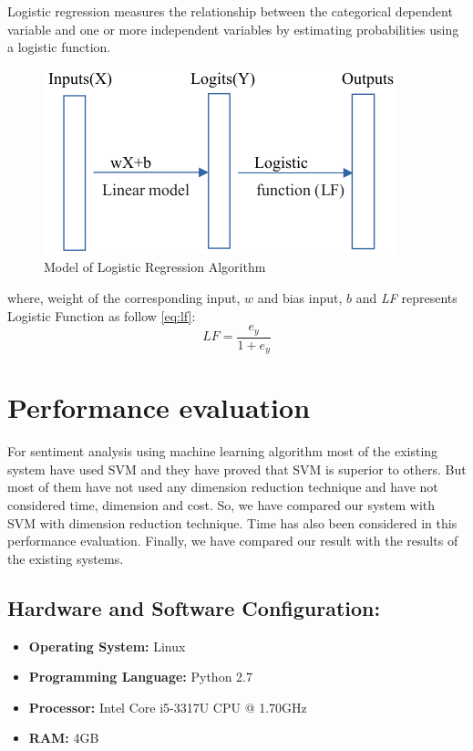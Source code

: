 \documentclass[10pt, conference]{IEEEtran}
\begin{document}
	Logistic regression measures the relationship between the categorical dependent variable and one or more independent variables by estimating probabilities using a logistic function.
	
	\begin{figure}[H]
		\includegraphics[width = 0.35\textheight]{logisticRegression}
		\caption{Model of Logistic Regression Algorithm}
		\label{fig:train}
	\end{figure}
	where, weight of the corresponding input, $w$ and bias input, $b$ and \textit{LF} represents Logistic Function as follow \eqref{eq:lf}:
	\begin{equation}
		LF = \dfrac{e_y}{1 + e_y}
		\label{eq:lf}
	\end{equation}
	
	\section{Performance evaluation}
	
	For sentiment analysis using machine learning algorithm most of the existing system have used SVM and they have proved that SVM is superior to others. But most of them have not used any dimension reduction technique and have not considered time, dimension and cost. So, we have compared our system with SVM with dimension reduction technique. Time has also been considered in this performance evaluation. Finally, we have compared our result with the results of the existing systems.
	
	\subsection{\textbf{Hardware and Software Configuration:}}
	\begin{itemize}
		\item \textbf{Operating System:} Linux
		\item \textbf{Programming Language:} Python 2.7
		\item \textbf{Processor:} Intel Core i5-3317U CPU @ 1.70GHz 
		\item \textbf{RAM:} 4GB
	\end{itemize}
	
\end{document}
